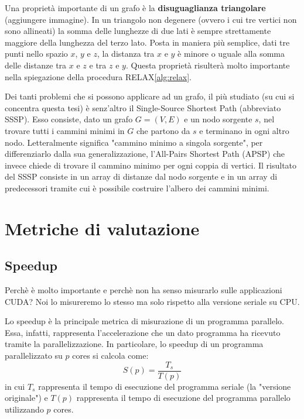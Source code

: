 \documentclass[a4paper]{article}
\begin{document}
	Una proprietà importante di un grafo è la \textbf{disuguaglianza triangolare} (aggiungere immagine). In un triangolo non degenere (ovvero i cui tre vertici non sono allineati) la somma delle lunghezze di due lati è sempre strettamente maggiore della lunghezza del terzo lato. Posta in maniera più semplice, dati tre punti nello spazio $x$, $y$ e $z$, la distanza tra $x$ e $y$ è minore o uguale alla somma delle distanze tra $x$ e $z$ e tra $z$ e $y$. Questa proprietà risulterà molto importante nella spiegazione della procedura RELAX\ref{alg:relax}.
	
	Dei tanti problemi che si possono applicare ad un grafo, il più studiato (su cui si concentra questa tesi) è senz'altro il Single-Source Shortest Path (abbreviato SSSP). Esso consiste, dato un grafo $G=(V,E)$ e un nodo sorgente $s$, nel trovare tutti i cammini minimi in $G$ che partono da $s$ e terminano in ogni altro nodo. Letteralmente significa "cammino minimo a singola sorgente", per differenziarlo dalla sua generalizzazione, l'All-Pairs Shortest Path (APSP) che invece chiede di trovare il cammino minimo per ogni coppia di vertici. Il risultato del SSSP consiste in un array di distanze dal nodo sorgente e in un array di predecessori tramite cui è possibile costruire l'albero dei cammini minimi.
	
	\section{Metriche di valutazione}
	\label{section:metriche}
	\subsection{Speedup}
	Perchè è molto importante e perchè non ha senso misurarlo sulle applicazioni CUDA? Noi lo misureremo lo stesso ma solo rispetto alla versione seriale su CPU.
	
	Lo speedup è la principale metrica di misurazione di un programma parallelo. Essa, infatti, rappresenta l'accelerazione che un dato programma ha ricevuto tramite la parallelizzazione. In particolare, lo speedup di un programma parallelizzato su $p$ cores si calcola come:
	\begin{equation}
		S(p) = \frac{T_s}{T(p)}
		\label{eq:speedup}
	\end{equation}
	in cui $T_s$ rappresenta il tempo di esecuzione del programma seriale (la "versione originale") e $T(p)$ rappresenta il tempo di esecuzione del programma parallelo utilizzando $p$ cores.
	
\end{document}
